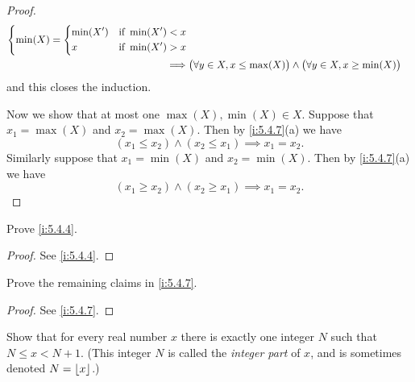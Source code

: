 \begin{proof}
\begin{align*}
\begin{dcases}
                 \min(X) = \begin{dcases}
                  \min(X') & \text{if } \min(X') < x \\
                  x        & \text{if } \min(X') > x
                \end{dcases}
               \end{dcases}                                                                                            \\
    \implies & \big(\forall y \in X, x \leq \max(X)\big) \land \big(\forall y \in X, x \geq \min(X)\big)
  \end{align*}
  and this closes the induction.

  Now we show that at most one \(\max(X), \min(X) \in X\).
  Suppose that \(x_1 = \max(X)\) and \(x_2 = \max(X)\).
  Then by \cref{i:5.4.7}(a) we have
  \[
    (x_1 \leq x_2) \land (x_2 \leq x_1) \implies x_1 = x_2.
  \]
  Similarly suppose that \(x_1 = \min(X)\) and \(x_2 = \min(X)\).
  Then by \cref{i:5.4.7}(a) we have
  \[
    (x_1 \geq x_2) \land (x_2 \geq x_1) \implies x_1 = x_2.
  \]
\end{proof}

\exercisesection

\begin{ex}\label{i:ex:5.4.1}
  Prove \cref{i:5.4.4}.
\end{ex}

\begin{proof}
  See \cref{i:5.4.4}.
\end{proof}

\begin{ex}\label{i:ex:5.4.2}
  Prove the remaining claims in \cref{i:5.4.7}.
\end{ex}

\begin{proof}
  See \cref{i:5.4.7}.
\end{proof}

\begin{ex}\label{i:ex:5.4.3}
  Show that for every real number \(x\) there is exactly one integer \(N\) such that \(N \leq x < N + 1\).
  (This integer \(N\) is called the \emph{integer part} of \(x\), and is sometimes denoted \(N = \left\lfloor x\right\rfloor\).)
\end{ex}

